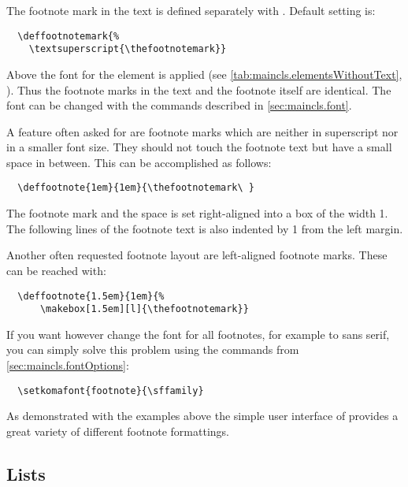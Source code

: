 The footnote mark in the text is defined separately with
. Default setting is:
\begin{lstlisting}
  \deffootnotemark{%
    \textsuperscript{\thefootnotemark}}
\end{lstlisting}
Above the font
for the element
 is
applied (see \autoref{tab:maincls.elementsWithoutText},
). Thus the
footnote marks in the text and the footnote itself are identical. The
font can be changed with the commands described in
\autoref{sec:maincls.font}.

\begin{Example}
  A feature often asked for are footnote marks which are neither in
  superscript nor in a smaller font size. They should not touch the
  footnote text but have a small space in between. This can be
  accomplished as follows:
\begin{lstlisting}
  \deffootnote{1em}{1em}{\thefootnotemark\ }
\end{lstlisting}
  The footnote mark and the space is set right-aligned into a
  box of the width 1. The following lines of the footnote
  text is also indented by 1 from the left margin.
 
  Another often requested footnote layout are left-aligned
  footnote marks. These can be reached with:
\begin{lstlisting}
  \deffootnote{1.5em}{1em}{%
      \makebox[1.5em][l]{\thefootnotemark}}
\end{lstlisting}
  
  If you want however change the font for all footnotes, for example
  to sans serif, you can simply solve this problem using the commands
  from \autoref{sec:maincls.fontOptions}:
\begin{lstlisting}
  \setkomafont{footnote}{\sffamily}
\end{lstlisting}
\end{Example}
As demonstrated with the examples above the simple user interface of
{\KOMAScript} provides a great variety of different footnote
formattings.
%
%
%
%
%


\subsection{Lists}
\label{sec:maincls.lists} 

